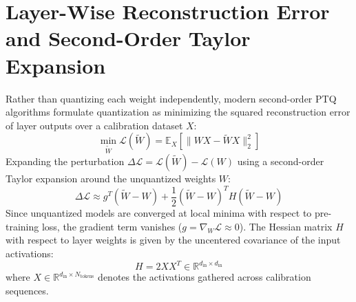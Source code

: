 \documentclass[12pt,a4paper,oneside]{report}
\begin{document}
\section{Layer-Wise Reconstruction Error and Second-Order Taylor Expansion}
Rather than quantizing each weight independently, modern second-order PTQ algorithms formulate quantization as minimizing the squared reconstruction error of layer outputs over a calibration dataset $X$:
\begin{equation}
    \min_{\widetilde{W}} \mathcal{L}(\widetilde{W}) = \mathbb{E}_{X} \left[ \| W X - \widetilde{W} X \|_2^2 \right]
\end{equation}
Expanding the perturbation $\Delta \mathcal{L} = \mathcal{L}(\widetilde{W}) - \mathcal{L}(W)$ using a second-order Taylor expansion around the unquantized weights $W$:
\begin{equation}
    \Delta \mathcal{L} \approx g^T (\widetilde{W} - W) + \frac{1}{2} (\widetilde{W} - W)^T H (\widetilde{W} - W)
\end{equation}
Since unquantized models are converged at local minima with respect to pre-training loss, the gradient term vanishes ($g = \nabla_W \mathcal{L} \approx 0$). The Hessian matrix $H$ with respect to layer weights is given by the uncentered covariance of the input activations:
\begin{equation}
    H = 2 X X^T \in \mathbb{R}^{d_{\text{in}} \times d_{\text{in}}}
\end{equation}
where $X \in \mathbb{R}^{d_{\text{in}} \times N_{\text{tokens}}}$ denotes the activations gathered across calibration sequences.
\end{document}
